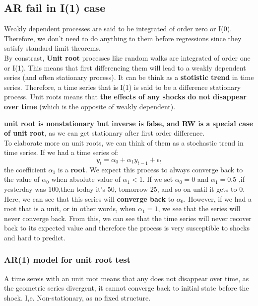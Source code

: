 \documentclass[12pt]{article}
\begin{document}
{\color{RoyalBlue}
\subsection{AR fail in I(1) case}}
Weakly dependent processes are said to be integrated of order zero or I(0). Therefore, we don’t need to do anything to them before regressions since they satisfy standard limit theorems. 
\\
By constrast, \textbf{Unit root} processes like random walks are integrated of order one or I(1). This means that first differencing them will lead to a weakly dependent series (and often stationary process). It can be think as a \textbf{stotistic trend} in time series. Therefore, a time series that is I(1) is said to be a difference stationary process. Unit roots means that \textbf{the effects of any shocks do not disappear over time} (which is the opposite of weakly dependent).

\textbf{unit root is nonstationary but inverse is false, and RW is a special case of unit root}, as we can get stationary after first order difference. \\

To elaborate more on unit roots, we can think of them as a stochastic trend in time series. If we had a time series of:
$$y_t = \alpha_0 + \alpha_1 y_{t−1} + \epsilon_t$$
the coefficient $\alpha_1$ is a \textbf{root}. We expect this process to always converge back to the value of $\alpha_0$ when absolute value of $\alpha_1 <1$. If we set $\alpha_0 = 0$ and $\alpha_1=0.5$ ,if yesterday was 100,then today it’s 50, tomorrow 25, and so on until it gets to 0. Here, we can see that this series will \textbf{converge back} to $\alpha_0$. However, if we had a root that is a unit, or in other words, when $\alpha_1=1$, we see that the series will never converge back. From this, we can see that the time series will never recover back to its expected value and therefore the process is very susceptible to shocks and hard to predict. 
\\

{\color{RoyalBlue}
\subsubsection{AR(1) model for unit root test}}
A time sereis with an unit root means that any does not disappear over time, as the geometric series divergent, it cannot converge back to initial state before the shock. I,e. Non-stationary, as no fixed structure.
\\
\end{document}
